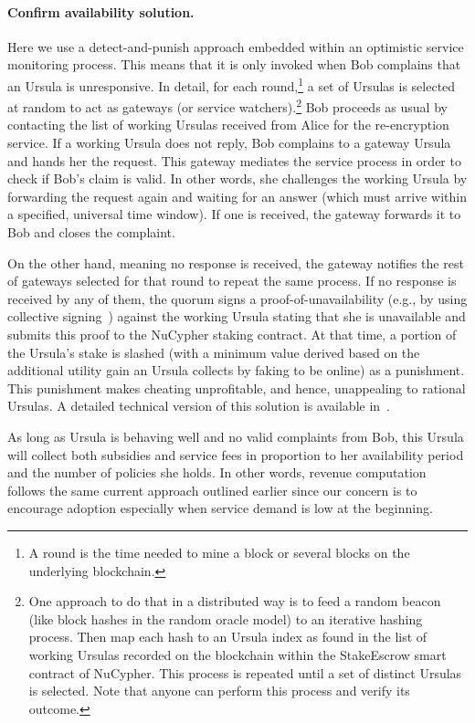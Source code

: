 \documentclass{llncs}
\begin{document}
\paragraph{Confirm availability solution.} Here we use a detect-and-punish approach embedded within an optimistic service monitoring process. This means that it is only invoked when Bob complains that an Ursula is unresponsive. In detail, for each round,\footnote{A round is the time needed to mine a block or several blocks on the underlying blockchain.} a set of Ursulas is selected at random to act as gateways (or service watchers).\footnote{One approach to do that in a distributed way is to feed a random beacon (like block hashes in the random oracle model) to an iterative hashing process. Then map each hash to an Ursula index as found in the list of working Ursulas recorded on the blockchain within the StakeEscrow smart contract of NuCypher. This process is repeated until a set of distinct Ursulas is selected. Note that anyone can perform this process and verify its outcome.} Bob proceeds as usual by contacting the list of working Ursulas received from Alice for the re-encryption service. If a working Ursula does not reply, Bob complains to a gateway Ursula and hands her the request. This gateway mediates the service process in order to check if Bob's claim is valid. In other words, she challenges the working Ursula by forwarding the request again and waiting for an answer (which must arrive within a specified, universal time window). If one is received, the gateway forwards it to Bob and closes the complaint. 


On the other hand, meaning no response is received, the gateway notifies the rest of gateways selected for that round to repeat the same process. If no response is received by any of them, the quorum signs a proof-of-unavailability (e.g., by using collective signing~\cite{syta2016keeping}) against the working Ursula stating that she is unavailable and submits this proof to the NuCypher staking contract. At that time, a portion of the Ursula's stake is slashed (with a minimum value derived based on the additional utility gain an Ursula collects by faking to be online) as a punishment. This punishment makes cheating unprofitable, and hence, unappealing to rational Ursulas. A detailed technical version of this solution is available in~\cite{confirm-activity-draft}.


As long as Ursula is behaving well and no valid complaints from Bob, this Ursula will collect both subsidies and service fees in proportion to her availability period and the number of policies she holds. In other words, revenue computation follows the same current approach outlined earlier since our concern is to encourage adoption especially when service demand is low at the beginning.
\end{document}
